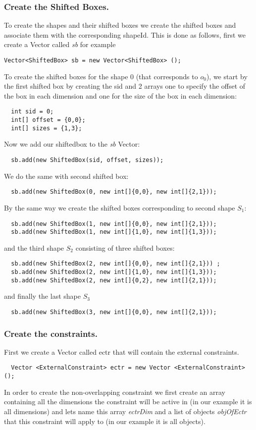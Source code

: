 \subsubsection{Create the Shifted Boxes.}\label{geostdescription:createtheshiftedboxes}\hypertarget{geostdescription:createtheshiftedboxes}{}
To create the shapes and their shifted boxes we create the shifted boxes and associate them with the corresponding shapeId. This is done as follows, first we create a Vector called \emph{sb} for example 
\begin{lstlisting}
Vector<ShiftedBox> sb = new Vector<ShiftedBox> ();
\end{lstlisting}
To create the shifted boxes for the shape 0 (that corresponds to $o_0$), we start by the first shifted box by creating the sid and 2 arrays one to specify the offset of the box in each dimension and one for the size of the box in each dimension:
\begin{lstlisting}
  int sid = 0; 
  int[] offset = {0,0};
  int[] sizes = {1,3};
\end{lstlisting} 
Now we add our shiftedbox to the \emph{sb} Vector:
\begin{lstlisting}
  sb.add(new ShiftedBox(sid, offset, sizes));
\end{lstlisting} 
We do the same with second shifted box:
\begin{lstlisting}
  sb.add(new ShiftedBox(0, new int[]{0,0}, new int[]{2,1}));
\end{lstlisting} 
By the same way we create the shifted boxes corresponding to second shape $S_1$:
\begin{lstlisting}
  sb.add(new ShiftedBox(1, new int[]{0,0}, new int[]{2,1}));
  sb.add(new ShiftedBox(1, new int[]{1,0}, new int[]{1,3}));
\end{lstlisting}
and the third shape $S_2$ consisting of three shifted boxes:
\begin{lstlisting}
  sb.add(new ShiftedBox(2, new int[]{0,0}, new int[]{2,1})) ;
  sb.add(new ShiftedBox(2, new int[]{1,0}, new int[]{1,3})); 
  sb.add(new ShiftedBox(2, new int[]{0,2}, new int[]{2,1}));
\end{lstlisting}
and finally the last shape $S_3$
\begin{lstlisting}
  sb.add(new ShiftedBox(3, new int[]{0,0}, new int[]{2,1}));
\end{lstlisting}

\subsubsection{Create the constraints.}\label{geostdescription:createtheconstraints}\hypertarget{geostdescription:createtheconstraints}{}
First we create a Vector called ectr that will contain the external constraints. 
\begin{lstlisting}
  Vector <ExternalConstraint> ectr = new Vector <ExternalConstraint>();
\end{lstlisting}
In order to create the non-overlapping constraint we first create an array containing all the dimensions the constraint will be active in (in our example it is all dimensions) and lets name this array \emph{ectrDim} and a list of objects \emph{objOfEctr} that this constraint will apply to (in our example it is all objects).

